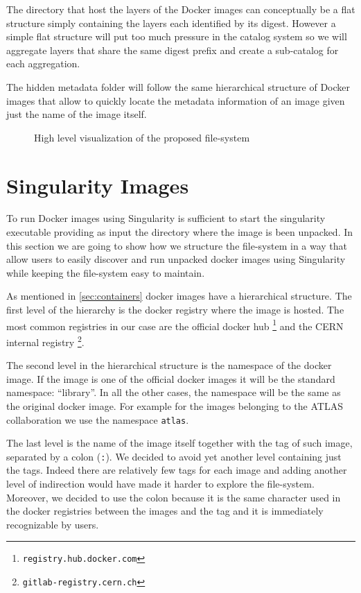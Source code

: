 The directory that host the layers of the Docker images can conceptually be a
flat structure simply containing the layers each identified by its digest.
However a simple flat structure will put too much pressure in the catalog
system so we will aggregate layers that share the same digest prefix and create
a sub-catalog for each aggregation.

The hidden metadata folder will follow the same hierarchical structure of
Docker images that allow to quickly locate the metadata information of an image
given just the name of the image itself.

\begin{figure}
\caption{High level visualization of the proposed file-system}
\label{fig:high-level-fs}
\end{figure}


\section{Singularity Images}
\label{sec:methodology-singularity}

To run Docker images using Singularity is sufficient to start the singularity
executable providing as input the directory where the image is been unpacked.
In this section we are going to show how we structure the file-system in a way
that allow users to easily discover and run unpacked docker images using
Singularity while keeping the file-system easy to maintain.

As mentioned in \ref{sec:containers} docker images have
a hierarchical structure.  The first level of the hierarchy is the docker
registry where the image is hosted.  The most common registries in our case are
the official docker hub \footnote{\texttt{registry.hub.docker.com}} and the
CERN internal registry \footnote{\texttt{gitlab-registry.cern.ch}}.

The second level in the hierarchical structure is the namespace of the docker
image.  If the image is one of the official docker images it will be the
standard namespace: “library”.  In all the other cases, the namespace will be
the same as the original docker image.  For example for the images belonging to
the ATLAS collaboration we use the namespace \texttt{atlas}.

The last level is the name of the image itself together with the tag of such
image, separated by a colon (\texttt{:}).  We decided to avoid yet another
level containing just the tags.  Indeed there are relatively few tags for each
image and adding another level of indirection would have made it harder to
explore the file-system.  Moreover, we decided to use the colon because it is
the same character used in the docker registries between the images and the tag
and it is immediately recognizable by users.

